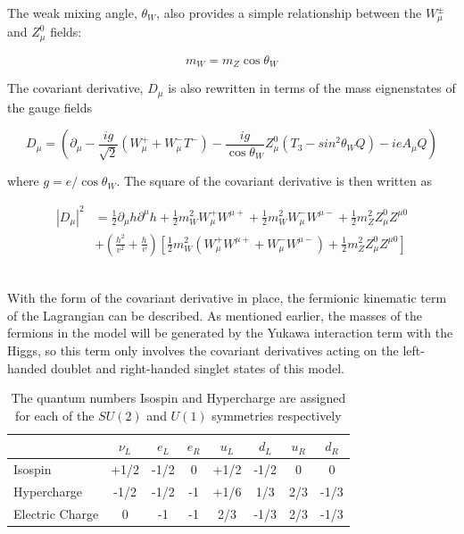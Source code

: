 \noindent The weak mixing angle, $\theta_{W}$, also provides a
simple relationship between the $W_{\mu}^{\pm}$ and $Z_{\mu}^{0}$
fields:

\begin{equation}\label{eq:ewk_mz_is_mwcosthetaW}
m_{W} = m_{Z}\cos{\theta_{W}}
\end{equation}

\noindent The covariant derivative, $D_{\mu}$ is also rewritten in
terms of the mass eignenstates of the gauge fields

\begin{equation}\label{eq:ewk_covariant_derivative_mass_eigenstates}
D_{\mu} = (\partial_{\mu} - \frac{ig}{\sqrt{2}}(W_{\mu}^{+} +
W_{\mu}^{-}T^{-}) -
\frac{ig}{\cos{\theta_{W}}}Z_{\mu}^{0}(T_{3}-sin^{2}{\theta_{W}}Q) -
ieA_{\mu}Q)
\end{equation}

\noindent where $g = e/\cos{\theta_{W}}$.  The square of the covariant
derivative is then written as

\begin{equation}\label{eq:ewk_covariant_derivative_squared_mass_eigenstates}
\begin{aligned}
|D_{\mu}|^{2} &= \frac{1}{2}\partial_{\mu}h\partial^{\mu}h +
\frac{1}{2}m_{W}^{2}W_{\mu}^{+}W^{\mu+} +
\frac{1}{2}m_{W}^{2}W_{\mu}^{-}W^{\mu-} +
\frac{1}{2}m_{Z}^{2}Z_{\mu}^{0}Z^{\mu0} \\
& + (\frac{h^{2}}{v^{2}} + \frac{h}{v})[
    \frac{1}{2}m_{W}^{2}(W_{\mu}^{+}W^{\mu+}+W_{\mu}^{-}W^{\mu-}) +
    \frac{1}{2}m_{Z}^{2}Z_{\mu}^{0}Z^{\mu0}]
\end{aligned}
\end{equation} 
\\
\par With the form of the covariant derivative in place, the
fermionic kinematic term of the Lagrangian can be described.  As
mentioned earlier, the masses of the fermions in the model will be
generated by the Yukawa interaction term with the Higgs, so this
term only involves the covariant derivatives acting on the left-handed
doublet and right-handed singlet states of this model.  

\begin{table}[h]
  \begin{center}
  \begin{tabular}{ | l | c | c | c | c | c | c | c | } \hline
    & $\nu_{L}$ & $e_{L}$ & $e_{R}$ & $u_{L}$ & $d_{L}$ & $u_{R}$ &
    $d_{R}$ \\ \hline
    Isospin & +1/2 & -1/2 & 0 & +1/2 & -1/2 & 0 & 0 \\ \hline
    Hypercharge & -1/2 & -1/2 & -1 & +1/6 & 1/3 & 2/3 & -1/3 \\ \hline
    Electric Charge & 0 & -1 & -1 & 2/3 & -1/3 & 2/3 & -1/3 \\ \hline
  \end{tabular}
  \caption{ The quantum numbers Isospin and Hypercharge are assigned for each of the $SU(2)$ and
      $U(1)$ symmetries respectively}
    \label{tab:ewk_fermion_quantum_numbers}
  \end{center}
\end{table} 


